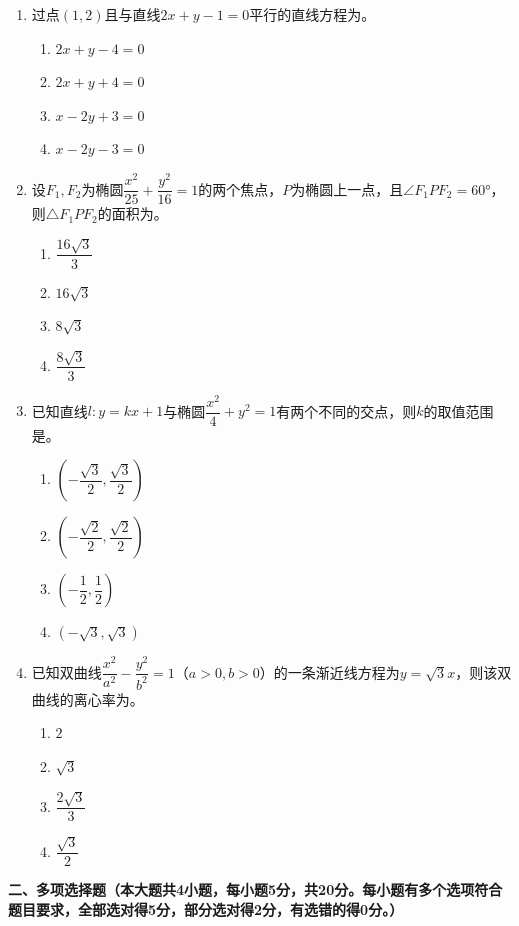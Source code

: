 \documentclass[12pt, a4paper]{ctexart}
\newcommand{\blank}[1]{\underline{\hspace{#1}}}
\begin{document}
\begin{enumerate}
\item 过点$(1,2)$且与直线$2x+y-1=0$平行的直线方程为\blank{3cm}。
\begin{enumerate}[label=\Alph*.]
\item $2x+y-4=0$
\item $2x+y+4=0$
\item $x-2y+3=0$
\item $x-2y-3=0$
\end{enumerate}

\item 设$F_1,F_2$为椭圆$\dfrac{x^2}{25}+\dfrac{y^2}{16}=1$的两个焦点，$P$为椭圆上一点，且$\angle F_1PF_2=60°$，则$\triangle F_1PF_2$的面积为\blank{3cm}。
\begin{enumerate}[label=\Alph*.]
\item $\dfrac{16\sqrt{3}}{3}$
\item $16\sqrt{3}$
\item $8\sqrt{3}$
\item $\dfrac{8\sqrt{3}}{3}$
\end{enumerate}

\item 已知直线$l:y=kx+1$与椭圆$\dfrac{x^2}{4}+y^2=1$有两个不同的交点，则$k$的取值范围是\blank{3cm}。
\begin{enumerate}[label=\Alph*.]
\item $\left(-\dfrac{\sqrt{3}}{2},\dfrac{\sqrt{3}}{2}\right)$
\item $\left(-\dfrac{\sqrt{2}}{2},\dfrac{\sqrt{2}}{2}\right)$
\item $\left(-\dfrac{1}{2},\dfrac{1}{2}\right)$
\item $\left(-\sqrt{3},\sqrt{3}\right)$
\end{enumerate}

\item 已知双曲线$\dfrac{x^2}{a^2}-\dfrac{y^2}{b^2}=1$（$a>0,b>0$）的一条渐近线方程为$y=\sqrt{3}x$，则该双曲线的离心率为\blank{3cm}。
\begin{enumerate}[label=\Alph*.]
\item $2$
\item $\sqrt{3}$
\item $\dfrac{2\sqrt{3}}{3}$
\item $\dfrac{\sqrt{3}}{2}$
\end{enumerate}
\end{enumerate}

\vspace{1em}

\noindent\textbf{二、多项选择题（本大题共4小题，每小题5分，共20分。每小题有多个选项符合题目要求，全部选对得5分，部分选对得2分，有选错的得0分。）}
\end{document}
